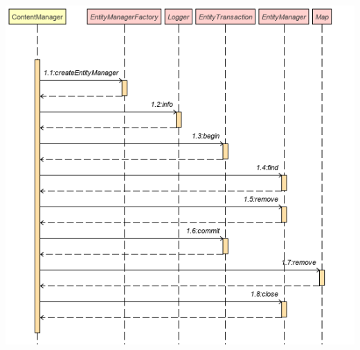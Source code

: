 \documentclass{article}
\begin{document}
\begin{center}
    \includegraphics[scale=0.5]{./Images/remove-image-sequence-diagram.png}
\end{center}
\end{document}
